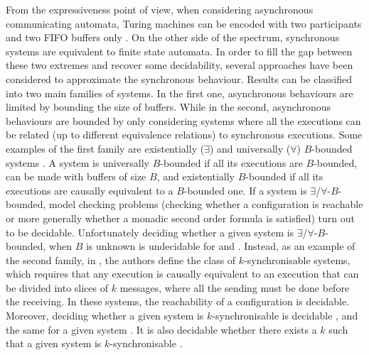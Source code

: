 \documentclass[submission,copyright,creativecommons,UKenglish]{eptcs}
\begin{document}
From the expressiveness point of view, when considering asynchronous communicating automata, Turing machines can be encoded with  two participants and two FIFO buffers only \cite{brand_communicating_1983}.  On the other side of the spectrum, synchronous systems are equivalent to finite state automata.
In order to fill the gap between these two extremes and recover some decidability,  several approaches have been considered to approximate the synchronous behaviour. Results can be classified into two main families of systems. In the first one,  asynchronous behaviours are limited by bounding the size of   buffers. While in the second, asynchronous behaviours are bounded by only considering systems where all the executions can be related  (up to different equivalence relations) to synchronous executions. 
%
Some examples of the first family  are existentially ($\exists$) and universally ($\forall$) $B$-bounded systems \cite{genest_kleene_2006}. A system is universally $B$-bounded if all its executions are $B$-bounded, \ie can be made with buffers of size $B$, and existentially $B$-bounded if all its executions are causally equivalent to a $B$-bounded one. 
If a system is $\exists$/$\forall$-$B$-bounded, model checking problems (\ie checking whether a configuration is reachable or more generally whether a monadic second order formula is satisfied) turn out to be decidable. Unfortunately deciding whether a given system is $\exists$/$\forall$-$B$-bounded, when $B$ is unknown is undecidable for \Ptp \cite{kuske_communicating_2010} and  \Mailbox \cite{bollig_unifying_2021}.
%
Instead, as an example of  the second family, in \cite{bouajjani_completeness_2018}, the authors define the class of $k$-synchronisable systems, which requires that any execution is causally equivalent to an execution that can be divided into slices of $k$ messages, where all the sending must be done before the receiving. In these systems, the reachability of a configuration is decidable. Moreover, deciding whether a given \Ptp system is $k$-synchronisable is decidable \cite{bouajjani_completeness_2018}, and the same for a given \Mailbox system \cite{digiusto_k-synchronizability_2020}. It is also decidable whether there exists a $k$ such that a given \Mailbox system is $k$-synchronisable \cite{giusto_guessing_2021}. 
\end{document}

